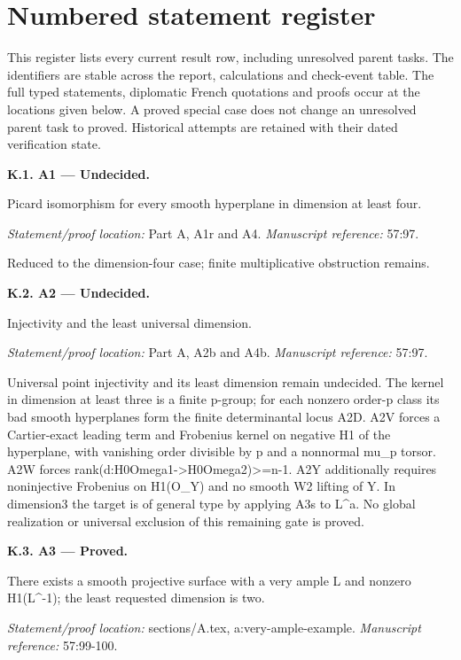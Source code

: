 \section{Numbered statement register}\label{sec:K}
This register lists every current result row, including unresolved parent tasks.
The identifiers are stable across the report, calculations and check-event table.
The full typed statements, diplomatic French quotations and proofs occur at the
locations given below. A proved special case does not change an unresolved parent
task to proved. Historical attempts are retained with their dated verification state.
\begingroup\small\raggedright
\par\medskip\noindent\textbf{K.1. A1 --- Undecided.}\par
Picard isomorphism for every smooth hyperplane in dimension at least four.
\par\emph{Statement/proof location:} Part A, A1r and A4.
\emph{Manuscript reference:} 57:97.
\par Reduced to the dimension-four case; finite multiplicative obstruction remains.
\par\medskip\noindent\textbf{K.2. A2 --- Undecided.}\par
Injectivity and the least universal dimension.
\par\emph{Statement/proof location:} Part A, A2b and A4b.
\emph{Manuscript reference:} 57:97.
\par Universal point injectivity and its least dimension remain undecided. The kernel in dimension at least three is a finite p-group; for each nonzero order-p class its bad smooth hyperplanes form the finite determinantal locus A2D. A2V forces a Cartier-exact leading term and Frobenius kernel on negative H1 of the hyperplane, with vanishing order divisible by p and a nonnormal mu\_p torsor. A2W forces rank(d:H0Omega1->H0Omega2)>=n-1. A2Y additionally requires noninjective Frobenius on H1(O\_Y) and no smooth W2 lifting of Y. In dimension3 the target is of general type by applying A3s to L\textasciicircum{}a. No global realization or universal exclusion of this remaining gate is proved.
\par\medskip\noindent\textbf{K.3. A3 --- Proved.}\par
There exists a smooth projective surface with a very ample L and nonzero H1(L\textasciicircum{}-1); the least requested dimension is two.
\par\emph{Statement/proof location:} sections/A.tex, a:very-ample-example.
\emph{Manuscript reference:} 57:99-100.
